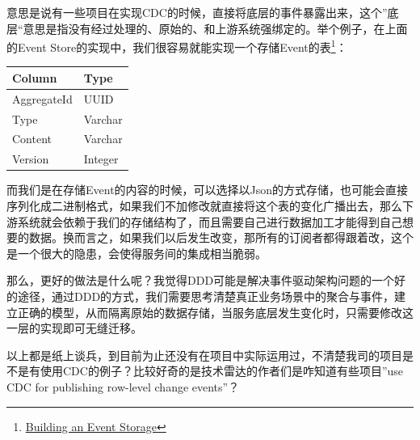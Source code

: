 \documentclass[12pt]{article}
\begin{document}
意思是说有一些项目在实现CDC的时候，直接将底层的事件暴露出来，这个''底层``意思是指没有经过处理的、原始的、和上游系统强绑定的。举个例子，在上面的Event Store的实现中，我们很容易就能实现一个存储Event的表\footnote{\href{https://cqrs.wordpress.com/documents/building-event-storage/}{Building an Event Storage}}：

{\def\LTcaptype{none} %
\begin{longtable}[]{@{}ll@{}}
\toprule\noalign{}
Column & Type \\
\midrule\noalign{}
\endhead
\bottomrule\noalign{}
\endlastfoot
AggregateId & UUID \\
Type & Varchar \\
Content & Varchar \\
Version & Integer \\
\end{longtable}
}

而我们是在存储Event的内容的时候，可以选择以Json的方式存储，也可能会直接序列化成二进制格式，如果我们不加修改就直接将这个表的变化广播出去，那么下游系统就会依赖于我们的存储结构了，而且需要自己进行数据加工才能得到自己想要的数据。换而言之，如果我们以后发生改变，那所有的订阅者都得跟着改，这个是一个很大的隐患，会使得服务间的集成相当脆弱。

那么，更好的做法是什么呢？我觉得DDD可能是解决事件驱动架构问题的一个好的途径，通过DDD的方式，我们需要思考清楚真正业务场景中的聚合与事件，建立正确的模型，从而隔离原始的数据存储，当服务底层发生变化时，只需要修改这一层的实现即可无缝迁移。

以上都是纸上谈兵，到目前为止还没有在项目中实际运用过，不清楚我司的项目是不是有使用CDC的例子？比较好奇的是技术雷达的作者们是咋知道有些项目''use CDC for publishing row-level change events''？
\end{document}
